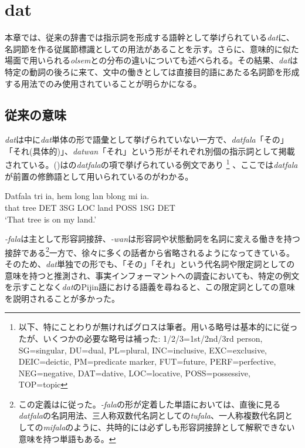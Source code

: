 \chapter{dat}

本章では、従来の辞書では指示詞を形成する語幹として挙げられている\textit{dat}に、名詞節を作る従属節標識としての用法があることを示す。さらに、意味的に似た場面で用いられる\textit{olsem}との分布の違いについても述べられる。その結果、\textit{dat}は特定の動詞の後ろに来て、文中の働きとしては直接目的語にあたる名詞節を形成する用法でのみ使用されていることが明らかになる。

\section{従来の意味}

\textit{dat}は\cite{dictionary}中に\textit{dat}単体の形で語彙として挙げられていない一方で、\textit{datfala}「その」「それ(具体的)」、\textit{datwan}「それ」という形がそれぞれ別個の指示詞として掲載されている。()は\cite{dictionary}の\textit{datfala}の項で挙げられている例文であり
\footnote{以下、特にことわりが無ければグロスは筆者。用いる略号は基本的に\cite{prepositions}に従ったが、いくつかの必要な略号は補った: 1/2/3=1st/2nd/3rd person, SG=singular, DU=dual, PL=plural, INC=inclusive, EXC=exclusive, DEIC=deictic, PM=predicate marker, FUT=future, PERF=perfective, NEG=negative, DAT=dative, LOC=locative, POSS=possessive, TOP=topic}
、ここでは\textit{datfala}が前置の修飾語として用いられているのがわかる。

\begin{exe}
  \ex
  \gll Datfala tri ia, hem long lan blong mi ia.\\
  that tree DET 3SG LOC land POSS 1SG DET\\
  \glt `That tree is on my land.'
\end{exe}

\textit{-fala}は主として形容詞接辞、\textit{-wan}は形容詞や状態動詞を名詞に変える働きを持つ接辞である\footnote{この定義は\cite{syntax}に従った。\textit{-fala}の形が定着した単語においては、直後に見る\textit{datfala}の名詞用法、三人称双数代名詞としての\textit{tufala}、一人称複数代名詞としての\textit{mifala}のように、共時的には必ずしも形容詞接辞として解釈できない意味を持つ単語もある。}一方で、徐々に多くの話者から省略されるようになってきている\citep{syntax}。
そのため、\textit{dat}単独での形でも、「その」「それ」という代名詞や限定詞としての意味を持つと推測され、事実インフォーマントへの調査においても、特定の例文を示すことなく\textit{dat}のPijin語における語義を尋ねると、この限定詞としての意味を説明されることが多かった。

